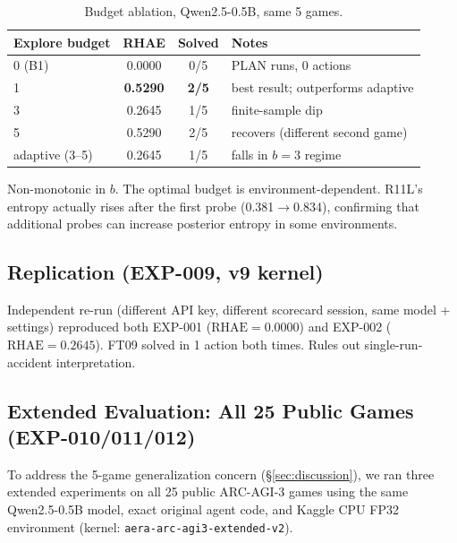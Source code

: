 \documentclass[11pt]{article}
\begin{document}
\begin{table}[h]
\centering
\caption{Budget ablation, Qwen2.5-0.5B, same 5 games.}
\label{tab:budget}
\begin{tabular}{lccl}
\toprule
Explore budget & RHAE & Solved & Notes \\
\midrule
0 (B1)            & 0.0000 & 0/5 & PLAN runs, 0 actions \\
1                 & \textbf{0.5290} & \textbf{2/5} & best result; outperforms adaptive \\
3                 & 0.2645 & 1/5 & finite-sample dip \\
5                 & 0.5290 & 2/5 & recovers (different second game) \\
adaptive (3--5)   & 0.2645 & 1/5 & falls in $b{=}3$ regime \\
\bottomrule
\end{tabular}
\end{table}

Non-monotonic in $b$. The optimal budget is environment-dependent. R11L's entropy actually rises after the first probe (0.381$\to$0.834), confirming that additional probes can increase posterior entropy in some environments.

\subsection{Replication (EXP-009, v9 kernel)}

Independent re-run (different API key, different scorecard session, same model + settings) reproduced both EXP-001 ($\text{RHAE}{=}0.0000$) and EXP-002 ($\text{RHAE}{=}0.2645$). FT09 solved in 1 action both times. Rules out single-run-accident interpretation.

\subsection{Extended Evaluation: All 25 Public Games (EXP-010/011/012)}
\label{sec:extended}

To address the 5-game generalization concern (\S\ref{sec:discussion}), we ran three extended experiments on all 25 public ARC-AGI-3 games using the same Qwen2.5-0.5B model, exact original agent code, and Kaggle CPU FP32 environment (kernel: \texttt{aera-arc-agi3-extended-v2}).
\end{document}
